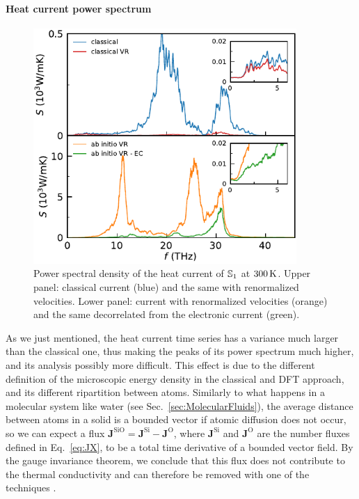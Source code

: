 \paragraph{Heat current power spectrum}
\begin{figure}[!tb]
    \centering
    \includegraphics[width=10cm]{chapters/chapter6/figures/silica_cl-q_psd_cfr.pdf}
    \caption{Power spectral density of the heat current of $\S1$ at $300\,\mathrm{K}$. Upper panel: classical current (blue) and the same with renormalized velocities. Lower panel: \abinitio current with renormalized velocities (orange) and the same decorrelated from the electronic current (green).}
    \label{fig:results-quantum-psd-cfr}
\end{figure}

As we just mentioned, the \abinitio heat current time series has a variance much larger than the classical one, thus making the peaks of its power spectrum much higher, and its analysis possibly more difficult. 
This effect is due to the different definition of the microscopic energy density in the classical and DFT approach, and its different ripartition between atoms. 
Similarly to what happens in a molecular system like water (see Sec.~\ref{sec:MolecularFluids}), the average distance between atoms in a solid is a bounded vector if atomic diffusion does not occur, so we can expect a flux $\mathbf{J}^\mathrm{SiO}=\mathbf{J}^\mathrm{Si}-\mathbf{J}^\mathrm{O}$, where $\mathbf{J}^\mathrm{Si}$ and $\mathbf{J}^\mathrm{O}$ are the number fluxes defined in Eq.~\eqref{eq:JX}, to be a total time derivative of a bounded vector field. By the gauge invariance theorem, we conclude that this flux does not contribute to the thermal conductivity and can therefore be removed with one of the techniques . 

